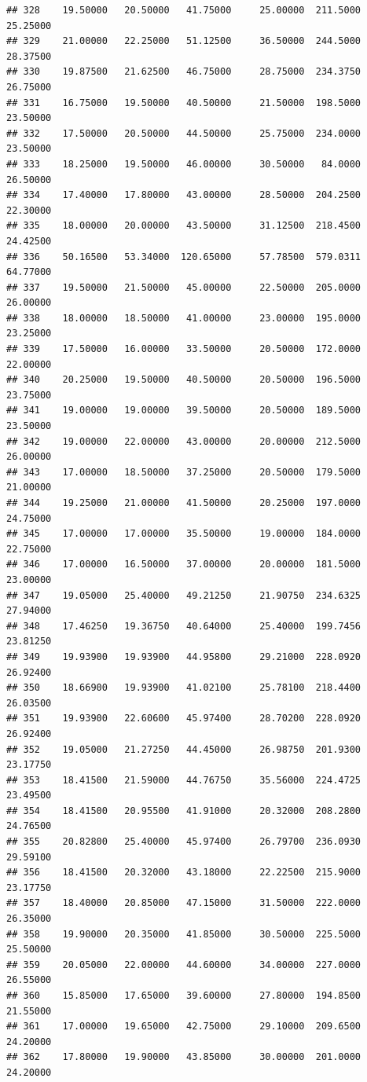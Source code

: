 \documentclass[]{article}
\begin{document}
\begin{verbatim}
## 328    19.50000   20.50000   41.75000     25.00000  211.5000    25.25000
## 329    21.00000   22.25000   51.12500     36.50000  244.5000    28.37500
## 330    19.87500   21.62500   46.75000     28.75000  234.3750    26.75000
## 331    16.75000   19.50000   40.50000     21.50000  198.5000    23.50000
## 332    17.50000   20.50000   44.50000     25.75000  234.0000    23.50000
## 333    18.25000   19.50000   46.00000     30.50000   84.0000    26.50000
## 334    17.40000   17.80000   43.00000     28.50000  204.2500    22.30000
## 335    18.00000   20.00000   43.50000     31.12500  218.4500    24.42500
## 336    50.16500   53.34000  120.65000     57.78500  579.0311    64.77000
## 337    19.50000   21.50000   45.00000     22.50000  205.0000    26.00000
## 338    18.00000   18.50000   41.00000     23.00000  195.0000    23.25000
## 339    17.50000   16.00000   33.50000     20.50000  172.0000    22.00000
## 340    20.25000   19.50000   40.50000     20.50000  196.5000    23.75000
## 341    19.00000   19.00000   39.50000     20.50000  189.5000    23.50000
## 342    19.00000   22.00000   43.00000     20.00000  212.5000    26.00000
## 343    17.00000   18.50000   37.25000     20.50000  179.5000    21.00000
## 344    19.25000   21.00000   41.50000     20.25000  197.0000    24.75000
## 345    17.00000   17.00000   35.50000     19.00000  184.0000    22.75000
## 346    17.00000   16.50000   37.00000     20.00000  181.5000    23.00000
## 347    19.05000   25.40000   49.21250     21.90750  234.6325    27.94000
## 348    17.46250   19.36750   40.64000     25.40000  199.7456    23.81250
## 349    19.93900   19.93900   44.95800     29.21000  228.0920    26.92400
## 350    18.66900   19.93900   41.02100     25.78100  218.4400    26.03500
## 351    19.93900   22.60600   45.97400     28.70200  228.0920    26.92400
## 352    19.05000   21.27250   44.45000     26.98750  201.9300    23.17750
## 353    18.41500   21.59000   44.76750     35.56000  224.4725    23.49500
## 354    18.41500   20.95500   41.91000     20.32000  208.2800    24.76500
## 355    20.82800   25.40000   45.97400     26.79700  236.0930    29.59100
## 356    18.41500   20.32000   43.18000     22.22500  215.9000    23.17750
## 357    18.40000   20.85000   47.15000     31.50000  222.0000    26.35000
## 358    19.90000   20.35000   41.85000     30.50000  225.5000    25.50000
## 359    20.05000   22.00000   44.60000     34.00000  227.0000    26.55000
## 360    15.85000   17.65000   39.60000     27.80000  194.8500    21.55000
## 361    17.00000   19.65000   42.75000     29.10000  209.6500    24.20000
## 362    17.80000   19.90000   43.85000     30.00000  201.0000    24.20000

\end{verbatim}
\end{document}
